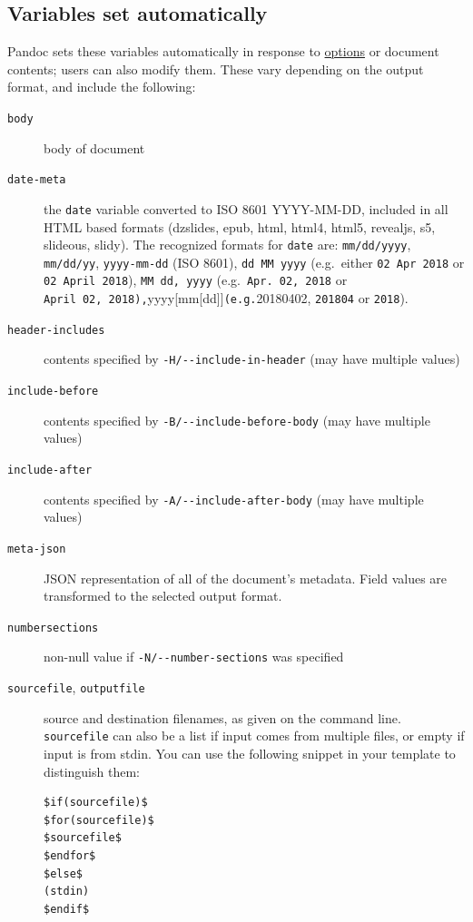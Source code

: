 \documentclass[
  b5paper
]{book}
\begin{document}
\subsection{Variables set
automatically}\label{variables-set-automatically}

Pandoc sets these variables automatically in response to
\hyperref[options]{options} or document contents; users can also modify
them. These vary depending on the output format, and include the
following:

\begin{description}
\item[\texttt{body}]
body of document
\item[\texttt{date-meta}]
the \texttt{date} variable converted to ISO 8601 YYYY-MM-DD, included in
all HTML based formats (dzslides, epub, html, html4, html5, revealjs,
s5, slideous, slidy). The recognized formats for \texttt{date} are:
\texttt{mm/dd/yyyy}, \texttt{mm/dd/yy}, \texttt{yyyy-mm-dd} (ISO 8601),
\texttt{dd\ MM\ yyyy} (e.g.~either \texttt{02\ Apr\ 2018} or
\texttt{02\ April\ 2018}), \texttt{MM\ dd,\ yyyy}
(e.g.~\texttt{Apr.\ 02,\ 2018} or
\texttt{April\ 02,\ 2018),}yyyy{[}mm{[}dd{]}{]}\texttt{(e.g.}20180402,
\texttt{201804} or \texttt{2018}).
\item[\texttt{header-includes}]
contents specified by \texttt{-H/-\/-include-in-header} (may have
multiple values)
\item[\texttt{include-before}]
contents specified by \texttt{-B/-\/-include-before-body} (may have
multiple values)
\item[\texttt{include-after}]
contents specified by \texttt{-A/-\/-include-after-body} (may have
multiple values)
\item[\texttt{meta-json}]
JSON representation of all of the document's metadata. Field values are
transformed to the selected output format.
\item[\texttt{numbersections}]
non-null value if \texttt{-N/-\/-number-sections} was specified
\item[\texttt{sourcefile}, \texttt{outputfile}]
source and destination filenames, as given on the command line.
\texttt{sourcefile} can also be a list if input comes from multiple
files, or empty if input is from stdin. You can use the following
snippet in your template to distinguish them:

\begin{verbatim}
$if(sourcefile)$
$for(sourcefile)$
$sourcefile$
$endfor$
$else$
(stdin)
$endif$
\end{verbatim}


\end{description}
\end{document}
